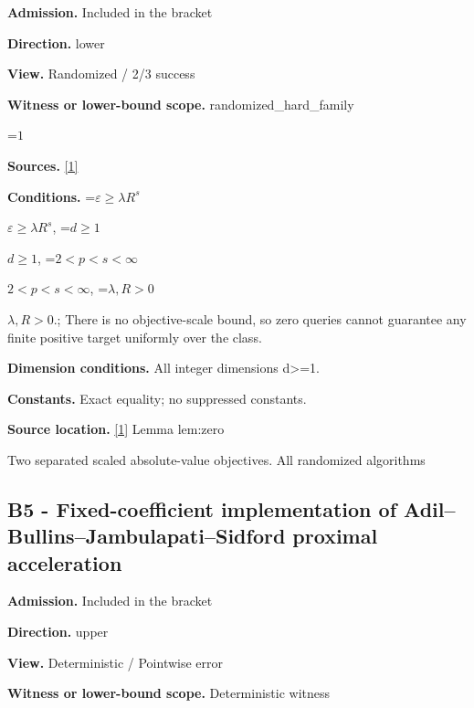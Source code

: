 \documentclass[10pt,a4paper]{article}
\newcommand{\AtlasMath}[1]{\par\begingroup\centering\setbox0=\hbox{$\displaystyle #1$}\ifdim\wd0>1.4\linewidth\typeout{ATLAS WIDE FORMULA: \the\wd0}\fi\ifdim\wd0>\linewidth\resizebox{\linewidth}{!}{\box0}\else\box0\fi\par\endgroup}
\newcommand{\AtlasInlineMath}[1]{\begingroup\setbox0=\hbox{$#1$}\ifdim\wd0>.4\linewidth\endgroup\AtlasMath{#1}\else\endgroup$#1$\fi}
\begin{document}
\textbf{Admission.} Included in the bracket



\textbf{Direction.} lower



\textbf{View.} Randomized / 2/3 success



\textbf{Witness or lower-bound scope.} randomized\_hard\_family



\AtlasMath{1}


\textbf{Sources.} \href{https://github.com/WU-Wendao/Colombo/blob/main/colombo_sensorium/Complexity_altas/data/sources/colombo/B2/manuscript.pdf}{[1]}



\textbf{Conditions.} \AtlasInlineMath{\varepsilon\ge\lambda R^s}, \AtlasInlineMath{d\ge1}, \AtlasInlineMath{2<p<s<\infty}, \AtlasInlineMath{\lambda,R>0}.; There is no objective-scale bound, so zero queries cannot guarantee any finite positive target uniformly over the class.



\textbf{Dimension conditions.} All integer dimensions d>=1.



\textbf{Constants.} Exact equality; no suppressed constants.



\textbf{Source location.} \href{https://github.com/WU-Wendao/Colombo/blob/main/colombo_sensorium/Complexity_altas/data/sources/colombo/B2/manuscript.pdf}{[1]} Lemma lem:zero



Two separated scaled absolute-value objectives. All randomized algorithms



\subsection{B5 - Fixed-coefficient implementation of Adil--Bullins--Jambulapati--Sidford proximal acceleration}


\textbf{Admission.} Included in the bracket



\textbf{Direction.} upper



\textbf{View.} Deterministic / Pointwise error



\textbf{Witness or lower-bound scope.} Deterministic witness
\end{document}
